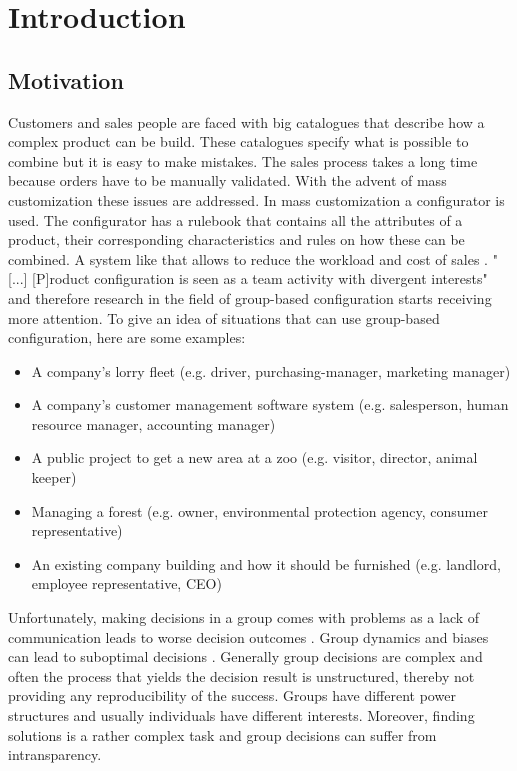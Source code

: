 \chapter{Introduction}
\label{ch:Introduction}

\section{Motivation}
\label{sec:Introduction:Goals}

Customers and sales people are faced with big catalogues that describe how a complex product can be build. These catalogues specify what is possible to combine but it is easy to make mistakes. The sales process takes a long time because orders have to be manually validated. With the advent of mass customization these issues are addressed. In mass customization a configurator is used. The configurator has a rulebook that contains all the attributes of a product, their corresponding characteristics and rules on how these can be combined. A system like that allows to reduce the workload and cost of sales \cite{shafieeCostBenefitAnalysis2018}. "[...] [P]roduct configuration is seen as a team activity with divergent interests" \cite{mendoncaCollaborativeProductConfiguration2008} and therefore research in the field of group-based configuration starts receiving more attention. 
To give an idea of situations that can use group-based configuration, here are some examples:
\begin{itemize}
    \item A company's lorry fleet (e.g. driver, purchasing-manager, marketing manager)
    \item A company's customer management software system (e.g. salesperson, human resource manager, accounting manager)
    \item A public project to get a new area at a zoo (e.g. visitor, director, animal keeper)
    \item Managing a forest (e.g. owner, environmental protection agency, consumer representative)
    \item An existing company building and how it should be furnished (e.g. landlord, employee representative, CEO)
\end{itemize}

Unfortunately, making decisions in a group comes with problems as a lack of communication leads to worse decision outcomes \cite{atasItemRecommendationUsing2017}. Group dynamics and biases can lead to suboptimal decisions \cite{kerrBiasJudgmentComparing1996}.
Generally group decisions are complex and often the process that yields the decision result is unstructured, thereby not providing any reproducibility of the success. Groups have different power structures and usually individuals have different interests. Moreover, finding solutions is a rather complex task and group decisions can suffer from intransparency.


